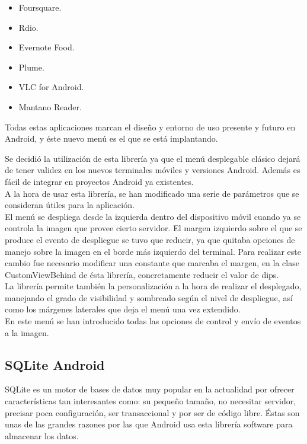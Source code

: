 \begin{itemize}
\item Foursquare.
\item Rdio.
\item Evernote Food.
\item Plume.
\item VLC for Android.
\item Mantano Reader.\\
\end{itemize}

Todas estas aplicaciones marcan el diseño y entorno de uso presente y futuro en Android, y éste nuevo menú es el que se está implantando.

Se decidió la utilización de esta librería ya que el menú desplegable clásico dejará de tener validez en los nuevos terminales móviles y versiones Android. Además es fácil de integrar en proyectos Android ya existentes.\\

A la hora de usar esta librería, se han modificado una serie de parámetros que se consideran útiles para la aplicación.\\

El menú se despliega desde la izquierda dentro del dispositivo móvil cuando ya se controla la imagen que provee cierto servidor. El margen izquierdo sobre el que se produce el evento de despliegue se tuvo que reducir, ya que quitaba opciones de manejo sobre la imagen en el borde más izquierdo del terminal. Para realizar este cambio fue necesario modificar una constante que marcaba el margen, en la clase CustomViewBehind de ésta librería, concretamente reducir el valor de dips. \\

La librería permite también la personalización a la hora de realizar el desplegado, manejando el grado de visibilidad y sombreado según el nivel de despliegue, así como los márgenes laterales que deja el menú una vez extendido.\\

En este menú se han introducido todas las opciones de control y envío de eventos a la imagen.\\

\subsection{SQLite Android}

SQLite es un motor de bases de datos muy popular en la actualidad por ofrecer características tan interesantes como: su pequeño tamaño, no necesitar servidor, precisar poca configuración, ser transaccional y por ser de código libre. Éstas son unas de las grandes razones por las que Android usa esta librería software para almacenar los datos. \\

